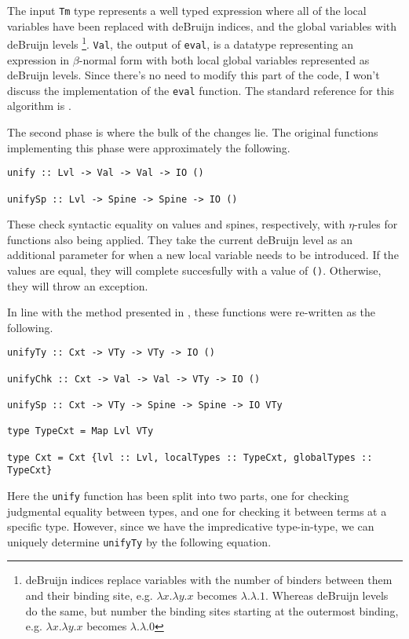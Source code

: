 \documentclass{article}
\begin{document}
The input \lstinline{Tm} type represents a well typed expression where all of the local variables have been replaced with deBruijn indices, and the global variables with deBruijn levels \footnote{deBruijn indices replace variables with the number of binders between them and their binding site, e.g. $\lambda x. \lambda y. x$ becomes $\lambda. \lambda. 1$. Whereas deBruijn levels do the same, but number the binding sites starting at the outermost binding, e.g. $\lambda x. \lambda y. x$ becomes $\lambda. \lambda. 0$}.
\lstinline{Val}, the output of \lstinline{eval}, is a datatype representing an expression in $\beta$-normal form with both local global variables represented as deBruijn levels.
Since there's no need to modify this part of the code, I won't discuss the implementation of the \lstinline{eval} function.
The standard reference for this algorithm is \citet{Coquand1996}.

The second phase is where the bulk of the changes lie.
The original functions implementing this phase were approximately the following.

\begin{lstlisting}
unify :: Lvl -> Val -> Val -> IO ()

unifySp :: Lvl -> Spine -> Spine -> IO ()
\end{lstlisting}

These check syntactic equality on values and spines, respectively, with $\eta$-rules for functions also being applied.
They take the current deBruijn level as an additional parameter for when a new local variable needs to be introduced.
If the values are equal, they will complete succesfully with a value of \lstinline{()}.
Otherwise, they will throw an exception.

In line with the method presented in \citet{Chapman2005}, these functions were re-written as the following.

\begin{lstlisting}
unifyTy :: Cxt -> VTy -> VTy -> IO ()

unifyChk :: Cxt -> Val -> Val -> VTy -> IO ()

unifySp :: Cxt -> VTy -> Spine -> Spine -> IO VTy

type TypeCxt = Map Lvl VTy

type Cxt = Cxt {lvl :: Lvl, localTypes :: TypeCxt, globalTypes :: TypeCxt}
\end{lstlisting}

Here the \lstinline{unify} function has been split into two parts, one for checking judgmental equality between types, and one for checking it between terms at a specific type.
However, since we have the impredicative type-in-type, we can uniquely determine \lstinline{unifyTy} by the following equation.
\end{document}
